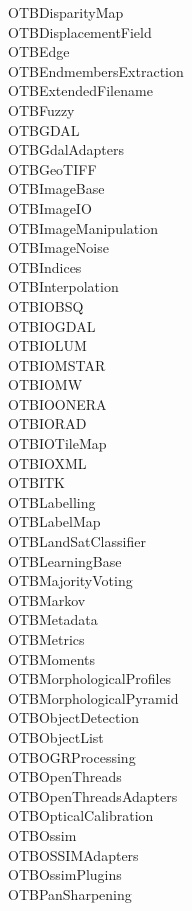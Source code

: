 \begin{multicols}{3}
OTBDisparityMap \\
OTBDisplacementField \\
OTBEdge \\
OTBEndmembersExtraction \\
OTBExtendedFilename \\
OTBFuzzy \\
OTBGDAL \\
OTBGdalAdapters \\
OTBGeoTIFF \\
OTBImageBase \\
OTBImageIO \\
OTBImageManipulation \\
OTBImageNoise \\
OTBIndices \\
OTBInterpolation \\
OTBIOBSQ \\
OTBIOGDAL \\
OTBIOLUM \\
OTBIOMSTAR \\
OTBIOMW \\
OTBIOONERA \\
OTBIORAD \\
OTBIOTileMap \\
OTBIOXML \\
OTBITK \\
OTBLabelling \\
OTBLabelMap \\
OTBLandSatClassifier \\
OTBLearningBase \\
OTBMajorityVoting \\
OTBMarkov \\
OTBMetadata \\
OTBMetrics \\
OTBMoments \\
OTBMorphologicalProfiles \\
OTBMorphologicalPyramid \\
OTBObjectDetection \\
OTBObjectList \\
OTBOGRProcessing \\
OTBOpenThreads \\
OTBOpenThreadsAdapters \\
OTBOpticalCalibration \\
OTBOssim \\
OTBOSSIMAdapters \\
OTBOssimPlugins \\
OTBPanSharpening \\

\end{multicols}

